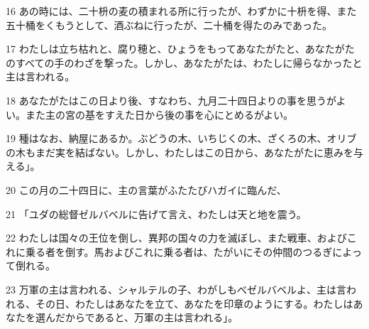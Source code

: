 \par 16 あの時には、二十枡の麦の積まれる所に行ったが、わずかに十枡を得、また五十桶をくもうとして、酒ぶねに行ったが、二十桶を得たのみであった。
\par 17 わたしは立ち枯れと、腐り穂と、ひょうをもってあなたがたと、あなたがたのすべての手のわざを撃った。しかし、あなたがたは、わたしに帰らなかったと主は言われる。
\par 18 あなたがたはこの日より後、すなわち、九月二十四日よりの事を思うがよい。また主の宮の基をすえた日から後の事を心にとめるがよい。
\par 19 種はなお、納屋にあるか。ぶどうの木、いちじくの木、ざくろの木、オリブの木もまだ実を結ばない。しかし、わたしはこの日から、あなたがたに恵みを与える」。
\par 20 この月の二十四日に、主の言葉がふたたびハガイに臨んだ、
\par 21 「ユダの総督ゼルバベルに告げて言え、わたしは天と地を震う。
\par 22 わたしは国々の王位を倒し、異邦の国々の力を滅ぼし、また戦車、およびこれに乗る者を倒す。馬およびこれに乗る者は、たがいにその仲間のつるぎによって倒れる。
\par 23 万軍の主は言われる、シャルテルの子、わがしもべゼルバベルよ、主は言われる、その日、わたしはあなたを立て、あなたを印章のようにする。わたしはあなたを選んだからであると、万軍の主は言われる」。


